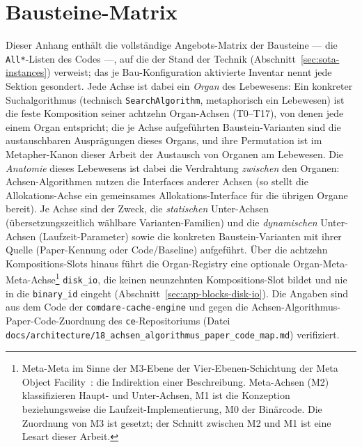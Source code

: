 \chapter{Bausteine-Matrix}\label{app:blocks}

Dieser Anhang enthält die vollständige Angebots-Matrix der Bausteine --- die \texttt{All*}-Listen des Codes ---, auf die der Stand der Technik
(Abschnitt~\ref{sec:sota-instances}) verweist; das je Bau-Konfiguration aktivierte Inventar nennt jede Sektion gesondert. Jede Achse ist dabei ein \emph{Organ} des Lebewesens: Ein konkreter Suchalgorithmus (technisch \texttt{SearchAlgorithm}, metaphorisch ein Lebewesen) ist die feste Komposition seiner achtzehn Organ-Achsen (T0--T17), von denen jede einem Organ entspricht; die je Achse aufgeführten Baustein-Varianten sind die austauschbaren Ausprägungen dieses Organs, und ihre Permutation ist im Metapher-Kanon dieser Arbeit der Austausch von Organen am Lebewesen. Die \emph{Anatomie} dieses Lebewesens ist dabei die Verdrahtung \emph{zwischen} den Organen: Achsen-Algorithmen nutzen die Interfaces anderer Achsen (so stellt die Allokations-Achse ein gemeinsames Allokations-Interface für die übrigen Organe bereit). Je Achse sind der Zweck, die \emph{statischen} Unter-Achsen
(übersetzungszeitlich wählbare Varianten-Familien) und die \emph{dynamischen} Unter-Achsen
(Laufzeit-Parameter) sowie die konkreten Baustein-Varianten mit ihrer Quelle (Paper-Kennung oder
Code/Baseline) aufgeführt. Über die achtzehn Kompositions-Slots hinaus führt die Organ-Registry eine optionale Organ-Meta-Meta-Achse\footnote{Meta-Meta im Sinne der M3-Ebene der Vier-Ebenen-Schichtung der Meta Object Facility~\cite{omg2016mof}: die Indirektion einer Beschreibung. Meta-Achsen (M2) klassifizieren Haupt- und Unter-Achsen, M1 ist die Konzeption beziehungsweise die Laufzeit-Implementierung, M0 der Binärcode. Die Zuordnung von M3 ist gesetzt; der Schnitt zwischen M2 und M1 ist eine Lesart dieser Arbeit.} \texttt{disk\_\allowbreak{}io}, die keinen neunzehnten Kompositions-Slot bildet und nie in die \texttt{binary\_\allowbreak{}id} eingeht (Abschnitt~\ref{sec:app-blocks-disk-io}). Die Angaben sind aus dem Code der \texttt{comdare-cache-engine} und gegen
die Achsen-Algorithmus-Paper-Code-Zuordnung des \texttt{ce}-Repositoriums (Datei \texttt{docs/\allowbreak{}architecture/\allowbreak{}18\_\allowbreak{}achsen\_\allowbreak{}algorithmus\_\allowbreak{}paper\_\allowbreak{}code\_\allowbreak{}map.md}) verifiziert.

